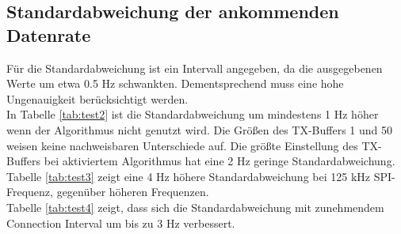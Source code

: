 \subsection{Standardabweichung der ankommenden Datenrate}
Für die Standardabweichung ist ein Intervall angegeben, da die ausgegebenen Werte um etwa 0.5 Hz schwankten.
Dementsprechend muss eine hohe Ungenauigkeit berücksichtigt werden.\\
In Tabelle \ref{tab:test2} ist die Standardabweichung um mindestens 1 Hz höher wenn der Algorithmus nicht genutzt wird.
Die Größen des TX-Buffers 1 und 50 weisen keine nachweisbaren Unterschiede auf.
Die größte Einstellung des TX-Buffers bei aktiviertem Algorithmus hat eine 2 Hz geringe Standardabweichung.\\
Tabelle \ref{tab:test3} zeigt eine 4 Hz höhere Standardabweichung bei 125 kHz SPI-Frequenz, gegenüber höheren Frequenzen.\\
Tabelle \ref{tab:test4} zeigt, dass sich die Standardabweichung mit zunehmendem Connection Interval um bis zu 3 Hz verbessert.
